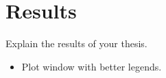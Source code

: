 \chapter{Results}

Explain the results of your thesis.

\begin{itemize}
    \item Plot window with better legends.
\end{itemize}